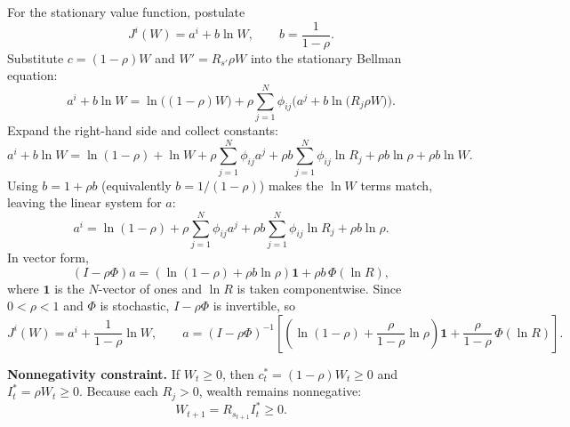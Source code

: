 \documentclass{article}
\begin{document}
\begin{enumerate}
For the stationary value function, postulate
\[
J^i(W)=a^i+b\ln W,
\qquad b=\frac{1}{1-\rho}.
\]
Substitute \(c=(1-\rho)W\) and \(W'=R_{s'}\rho W\) into the stationary Bellman equation:
\[
a^i+b\ln W
=
\ln\big((1-\rho)W\big)
+
\rho\sum_{j=1}^N\phi_{ij}\Big(a^j+b\ln\big(R_j\rho W\big)\Big).
\]
Expand the right-hand side and collect constants:
\[
a^i+b\ln W
=
\ln(1-\rho)+\ln W
+
\rho\sum_{j=1}^N\phi_{ij}a^j
+
\rho b\sum_{j=1}^N\phi_{ij}\ln R_j
+
\rho b\ln\rho
+
\rho b\ln W.
\]
Using \(b=1+\rho b\) (equivalently \(b=1/(1-\rho)\)) makes the \(\ln W\) terms match, leaving the linear system for \(a\):
\[
a^i
=
\ln(1-\rho)
+
\rho\sum_{j=1}^N\phi_{ij}a^j
+
\rho b\sum_{j=1}^N\phi_{ij}\ln R_j
+
\rho b\ln\rho.
\]
In vector form,
\[
(I-\rho\Phi)a
=
\left(\ln(1-\rho)+\rho b\ln\rho\right)\mathbf 1
+
\rho b\,\Phi(\ln R),
\]
where \(\mathbf 1\) is the \(N\)-vector of ones and \(\ln R\) is taken componentwise.
Since \(0<\rho<1\) and \(\Phi\) is stochastic, \(I-\rho\Phi\) is invertible, so
\[
\boxed{
J^i(W)=a^i+\frac{1}{1-\rho}\ln W,
\qquad
a=(I-\rho\Phi)^{-1}
\left[
\left(\ln(1-\rho)+\frac{\rho}{1-\rho}\ln\rho\right)\mathbf 1
+
\frac{\rho}{1-\rho}\,\Phi(\ln R)
\right].
}
\]

\medskip
\noindent\textbf{Nonnegativity constraint.}
If \(W_t\ge 0\), then \(c_t^*=(1-\rho)W_t\ge 0\) and \(I_t^*=\rho W_t\ge 0\).
Because each \(R_j>0\), wealth remains nonnegative:
\[
W_{t+1}=R_{s_{t+1}}I_t^*\ge 0.
\]
\end{enumerate}
\end{document}
